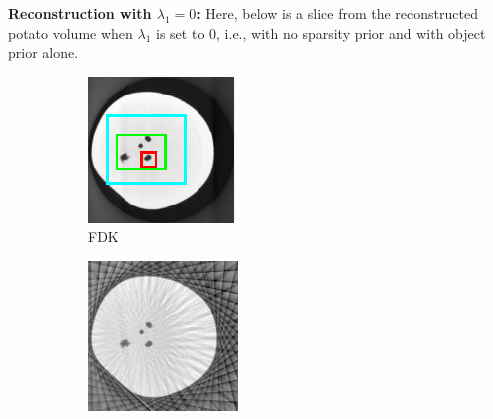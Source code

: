 \documentclass{article}
\begin{document}
\textbf{Reconstruction with $\lambda_1 =0$:} Here, below is a slice from the reconstructed potato volume when $\lambda_1$ is set to $0$, i.e., with no sparsity prior and with object prior alone.
\begin{figure}[!h]
    \begin{subfigure}[b]{0.3\linewidth}
        \includegraphics[width=\textwidth]{../images/potato/cs_lambda_0/testIm_green}
        \caption{FDK}
    \end{subfigure}
    \begin{subfigure}[b]{0.3\linewidth}
        \includegraphics[width=\textwidth]{../images/potato/cs_lambda_0/fdkIm_green.png}

\end{subfigure}
\end{figure}
\end{document}

